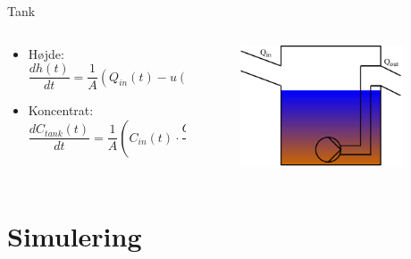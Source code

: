 \begin{frame}{Tank}{}
\vfill\vfill\centering
	\begin{columns}
	\begin{column}{0.75\textwidth}
		\begin{itemize}
			\vspace{4mm}
			\item<1-> Højde: \\ 
			\vspace{3mm}	
			$\dfrac{dh(t)}{dt}=\dfrac{1}{A} \left(Q_{in}(t)-u(t) \cdot \overline Q \right)$
			\vspace{3mm}
			\item<2-> Koncentrat: \\ 
			\vspace{3mm}
			$\dfrac{dC_{tank}(t)}{dt} = \dfrac{1}{A} \left(C_{in}(t) \cdot \dfrac{Q_{in}(t)}{h(t)} - C_{tank}(t) \cdot \dfrac{Q_{out}(t)}{h(t)} \right)$
		\end{itemize}
	\end{column}

	\begin{column}{0.3\textwidth}
		\begin{figure}[H]
			\centering
			\includegraphics[width=0.9\textwidth]{Sections/pictures/reservior_with_pump.pdf}
		\end{figure}
	\end{column}
\end{columns}
\vfill\vfill		
\end{frame}
	
\section{Simulering}
